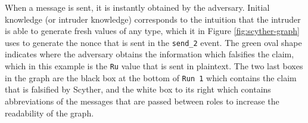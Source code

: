 When a message is sent, it is instantly obtained by the adversary. Initial knowledge (or intruder knowledge) corresponds to the intuition that the intruder is able to generate fresh values of any type, which it in Figure \ref{fig:scyther-graph} uses to generate the nonce that is sent in the \texttt{send\_2} event. The green oval shape indicates where the adversary obtains the information which falsifies the claim, which in this example is the \texttt{Ru} value that is sent in plaintext. The two last boxes in the graph are the black box at the bottom of \texttt{Run 1} which contains the claim that is falsified by Scyther, and the white box to its right which contains abbreviations of the messages that are passed between roles to increase the readability of the graph.


